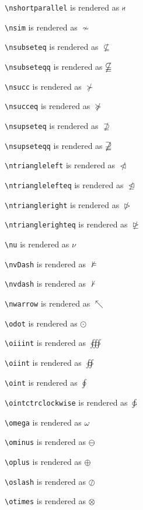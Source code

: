\texttt{\textbackslash nshortparallel} is rendered as $\nshortparallel$

\texttt{\textbackslash nsim} is rendered as $\nsim$

\texttt{\textbackslash nsubseteq} is rendered as $\nsubseteq$

\texttt{\textbackslash nsubseteqq} is rendered as $\nsubseteqq$

\texttt{\textbackslash nsucc} is rendered as $\nsucc$

\texttt{\textbackslash nsucceq} is rendered as $\nsucceq$

\texttt{\textbackslash nsupseteq} is rendered as $\nsupseteq$

\texttt{\textbackslash nsupseteqq} is rendered as $\nsupseteqq$

\texttt{\textbackslash ntriangleleft} is rendered as $\ntriangleleft$

\texttt{\textbackslash ntrianglelefteq} is rendered as $\ntrianglelefteq$

\texttt{\textbackslash ntriangleright} is rendered as $\ntriangleright$

\texttt{\textbackslash ntrianglerighteq} is rendered as $\ntrianglerighteq$

\texttt{\textbackslash nu} is rendered as $\nu$

\texttt{\textbackslash nvDash} is rendered as $\nvDash$

\texttt{\textbackslash nvdash} is rendered as $\nvdash$

\texttt{\textbackslash nwarrow} is rendered as $\nwarrow$

\texttt{\textbackslash odot} is rendered as $\odot$

\texttt{\textbackslash oiiint} is rendered as $\oiiint$

\texttt{\textbackslash oiint} is rendered as $\oiint$

\texttt{\textbackslash oint} is rendered as $\oint$

\texttt{\textbackslash ointctrclockwise} is rendered as $\ointctrclockwise$

\texttt{\textbackslash omega} is rendered as $\omega$

\texttt{\textbackslash ominus} is rendered as $\ominus$

\texttt{\textbackslash oplus} is rendered as $\oplus$

\texttt{\textbackslash oslash} is rendered as $\oslash$

\texttt{\textbackslash otimes} is rendered as $\otimes$

